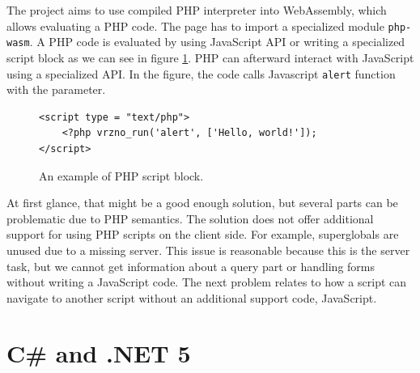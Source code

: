 The project  aims to use compiled PHP interpreter into WebAssembly, which allows evaluating a PHP code.
The page has to import a specialized module \texttt{php-wasm}. 
A PHP code is evaluated by using JavaScript API or writing a specialized script block as we can see in figure \ref{img03:vrzno}.
PHP can afterward interact with JavaScript using a specialized API.
In the figure, the code calls Javascript \texttt{alert} function with the parameter.
\par
\begin{figure}
\begin{lstlisting}
<script type = "text/php">
	<?php vrzno_run('alert', ['Hello, world!']);
</script>
\end{lstlisting}
\caption{An example of PHP script block.}
\label{img03:vrzno}
\end{figure}
\par
At first glance, that might be a good enough solution, but several parts can be problematic due to PHP semantics.
The solution does not offer additional support for using PHP scripts on the client side.
For example, superglobals are unused due to a missing server.
This issue is reasonable because this is the server task, but we cannot get information about a query part or handling forms without writing a JavaScript code.
The next problem relates to how a script can navigate to another script without an additional support code, JavaScript.

\section{C\# and .NET 5}

